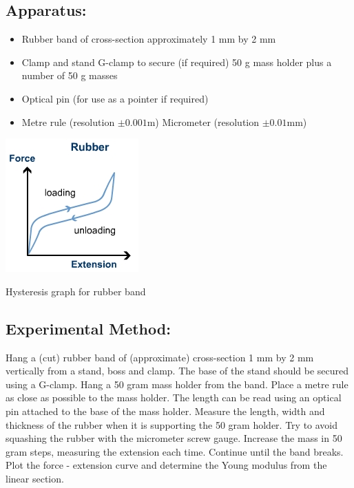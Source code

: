 \subsection{Apparatus:} 
\begin{itemize}
\item Rubber band of cross-section approximately 1 mm by 2 mm 
\item Clamp and stand G-clamp to secure (if required) 50 g mass holder plus a number of 50 g masses 
\item Optical pin (for use as a pointer if required) 
\item Metre rule (resolution $\pm 0.001$m) Micrometer (resolution $\pm 0.01$mm)
\end{itemize}
\begin{marginfigure}
\includegraphics{hyst.jpg}
\caption{Hysteresis graph for rubber band}
\end{marginfigure}
\subsection{Experimental Method:}  
Hang a (cut) rubber band of (approximate) cross-section 1 mm by 2 mm vertically from a stand, boss and clamp. The base of the stand should be secured using a G-clamp. Hang a 50 gram mass holder from the band. Place a metre rule as close as possible to the mass holder. The length can be read using an optical pin attached to the base of the mass holder.
Measure the length, width and thickness of the rubber when it is supporting the 50 gram holder. Try to avoid squashing the rubber with the micrometer screw gauge. Increase the mass in 50 gram steps, measuring the extension each time. Continue until the band breaks. Plot the force - extension curve and determine the Young modulus from the linear section.  
